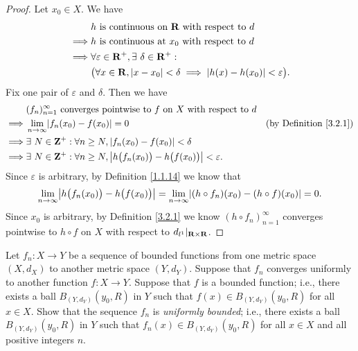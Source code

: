 \begin{proof}
    Let \(x_0 \in X\).
    We have
    \begin{align*}
                 & h \text{ is continuous on } \mathbf{R} \text{ with respect to } d                                      \\
        \implies & h \text{ is continuous at } x_0 \text{ with respect to } d                                     \\
        \implies & \forall \varepsilon \in \mathbf{R}^+, \exists\ \delta \in \mathbf{R}^+ :                                       \\
                 & \big(\forall x \in \mathbf{R}, \left\lvert x - x_0\right\rvert < \delta \implies \left\lvert h(x) - h(x_0)\right\rvert < \varepsilon\big).
    \end{align*}
    Fix one pair of \(\varepsilon\) and \(\delta\).
    Then we have
    \begin{align*}
                 & (f_n)_{n = 1}^\infty \text{ converges pointwise to } f \text{ on } X \text{ with respect to } d                                           \\
        \implies & \lim_{n \to \infty} \abs{f_n(x_0) - f(x_0)} = 0                                                      & \text{(by Definition \ref{3.2.1})} \\
        \implies & \exists\ N \in \Z^+ : \forall n \geq N, \abs{f_n(x_0) - f(x_0)} < \delta                                                                  \\
        \implies & \exists\ N \in \Z^+ : \forall n \geq N, \abs{h\big(f_n(x_0)\big) - h\big(f(x_0)\big)} < \varepsilon.
    \end{align*}
    Since \(\varepsilon\) is arbitrary, by Definition \ref{1.1.14} we know that
    \[
        \lim_{n \to \infty} \abs{h\big(f_n(x_0)\big) - h\big(f(x_0)\big)} = \lim_{n \to \infty} \abs{(h \circ f_n)(x_0) - (h \circ f)(x_0)} = 0.
    \]
    Since \(x_0\) is arbitrary, by Definition \ref{3.2.1} we know \((h \circ f_n)_{n = 1}^\infty\) converges pointwise to \(h \circ f\) on \(X\) with respect to \(d_{l^1}|_{\mathbf{R} \times \mathbf{R}}\).
\end{proof}

\begin{exercise}\label{ex 3.2.4}
    Let \(f_n : X \to Y\) be a sequence of bounded functions from one metric space \((X, d_X)\) to another metric space \((Y, d_Y)\).
    Suppose that \(f_n\) converges uniformly to another function \(f : X \to Y\).
    Suppose that \(f\) is a bounded function;
    i.e., there exists a ball \(B_{(Y, d_Y)}(y_0, R)\) in \(Y\) such that \(f(x) \in B_{(Y, d_Y)}(y_0, R)\) for all \(x \in X\).
    Show that the sequence \(f_n\) is \emph{uniformly bounded};
    i.e., there exists a ball \(B_{(Y, d_Y)}(y_0, R)\) in \(Y\) such that \(f_n(x) \in B_{(Y, d_Y)}(y_0, R)\) for all \(x \in X\) and all positive integers \(n\).
\end{exercise}

